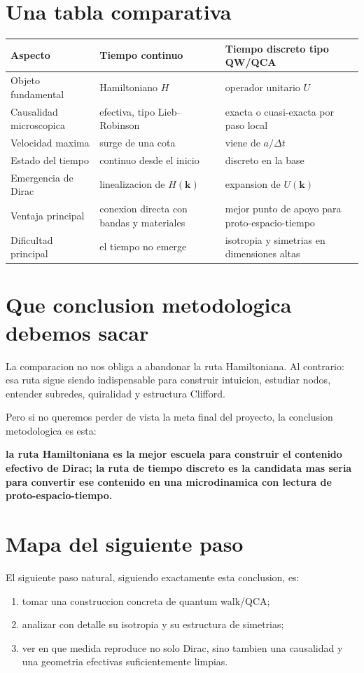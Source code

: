 \section{Una tabla comparativa}
\begin{center}
\begin{tabular}{p{4.3cm} p{5.2cm} p{5.2cm}}
\toprule
Aspecto & Tiempo continuo & Tiempo discreto tipo QW/QCA \\
\midrule
Objeto fundamental & Hamiltoniano \(H\) & operador unitario \(U\) \\
Causalidad microscopica & efectiva, tipo Lieb--Robinson & exacta o cuasi-exacta por paso local \\
Velocidad maxima & surge de una cota & viene de \(a/\Delta t\) \\
Estado del tiempo & continuo desde el inicio & discreto en la base \\
Emergencia de Dirac & linealizacion de \(H(\bm{k})\) & expansion de \(U(\bm{k})\) \\
Ventaja principal & conexion directa con bandas y materiales & mejor punto de apoyo para proto-espacio-tiempo \\
Dificultad principal & el tiempo no emerge & isotropia y simetrias en dimensiones altas \\
\bottomrule
\end{tabular}
\end{center}

\section{Que conclusion metodologica debemos sacar}
La comparacion no nos obliga a abandonar la ruta Hamiltoniana. Al contrario: esa ruta sigue siendo indispensable para construir intuicion, estudiar nodos, entender subredes, quiralidad y estructura Clifford.

Pero si no queremos perder de vista la meta final del proyecto, la conclusion metodologica es esta:
\begin{displayquote}
\textbf{la ruta Hamiltoniana es la mejor escuela para construir el contenido efectivo de Dirac; la ruta de tiempo discreto es la candidata mas seria para convertir ese contenido en una microdinamica con lectura de proto-espacio-tiempo.}
\end{displayquote}

\section{Mapa del siguiente paso}
El siguiente paso natural, siguiendo exactamente esta conclusion, es:
\begin{enumerate}[label=\arabic*.]
    \item tomar una construccion concreta de quantum walk/QCA;
    \item analizar con detalle su isotropia y su estructura de simetrias;
    \item ver en que medida reproduce no solo Dirac, sino tambien una causalidad y una geometria efectivas suficientemente limpias.
\end{enumerate}

